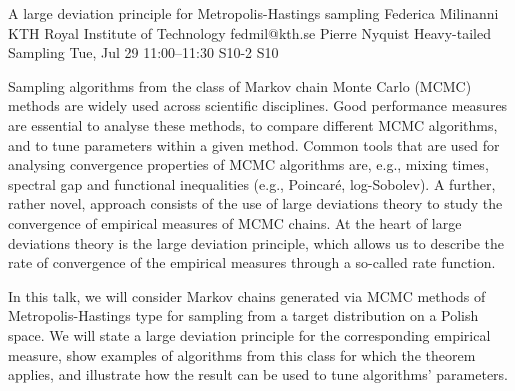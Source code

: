 \documentclass[12pt,lettersize,oneside]{book} %
\begin{document}
\begin{talk}
  {A large deviation principle for Metropolis-Hastings sampling}%
  {Federica Milinanni}%
  {KTH Royal Institute of Technology}%
  {fedmil@kth.se}%
  {Pierre Nyquist}%
  {Heavy-tailed Sampling}%
  {Tue, Jul 29 11:00--11:30}%
  {S10-2}%
  {S10}%
    
   
   
Sampling algorithms from the class of Markov chain Monte Carlo (MCMC) methods are widely used across scientific disciplines. Good performance measures are essential to analyse these methods, to compare different MCMC algorithms, and to tune parameters within a given method. Common tools that are used for analysing convergence properties of MCMC algorithms are, e.g., mixing times, spectral gap and functional inequalities (e.g., Poincar\'e, log-Sobolev). A further, rather novel, approach consists of the use of large deviations theory to study the convergence of empirical measures of MCMC chains. At the heart of large deviations theory is the large deviation principle, which allows us to describe the rate of convergence of the empirical measures through a so-called rate function.

In this talk, we will consider Markov chains generated via MCMC methods of Metropolis-Hastings type for sampling from a target distribution on a Polish space. We will state a large deviation principle for the corresponding empirical measure, show examples of algorithms from this class for which the theorem applies, and illustrate how the result can be used to tune algorithms' parameters.

\medskip

\end{talk}
\end{document}

